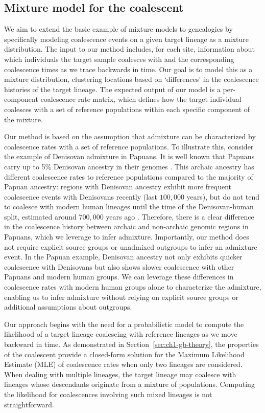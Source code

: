 \subsection{Mixture model for the coalescent}
\label{the_model}
We aim to extend the basic example of mixture models to genealogies by specifically modeling coalescence events on a given target lineage as a mixture distribution. The input to our method includes, for each site, information about which individuals the target sample coalesces with and the corresponding coalescence times as we trace backwards in time. Our goal is to model this as a mixture distribution, clustering locations based on `differences' in the coalescence histories of the target lineage. The expected output of our model is a per-component coalescence rate matrix, which defines how the target individual coalesces with a set of reference populations within each specific component of the mixture.

Our method is based on the assumption that admixture can be characterized by coalescence rates with a set of reference populations. To illustrate this, consider the example of Denisovan admixture in Papuans. It is well known that Papuans carry up to 5\% Denisovan ancestry in their genomes \cite{reich2010genetic}. This archaic ancestry has different coalescence rates to reference populations compared to the majority of Papuan ancestry: regions with Denisovan ancestry exhibit more frequent coalescence events with Denisovans recently (last $100{,}000$ years), but do not tend to coalesce with modern human lineages until the time of the Denisovan-human split, estimated around $700{,}000$ years ago \cite{reich2010genetic}. Therefore, there is a clear difference in the coalescence history between archaic and non-archaic genomic regions in Papuans, which we leverage to infer admixture. Importantly, our method does not require explicit source groups or unadmixed outgroups to infer an admixture event. In the Papuan example, Denisovan ancestry not only exhibits quicker coalescence with Denisovans but also shows slower coalescence with other Papuans and modern human groups. We can leverage these differences in coalescence rates with modern human groups alone to characterize the admixture, enabling us to infer admixture without relying on explicit source groups or additional assumptions about outgroups.

Our approach begins with the need for a probabilistic model to compute the likelihood of a target lineage coalescing with reference lineages as we move backward in time. As demonstrated in Section~\ref{sec:ch1-gb-theory}, the properties of the coalescent provide a closed-form solution for the Maximum Likelihood Estimate (MLE) of coalescence rates when only two lineages are considered. When dealing with multiple lineages, the target lineage may coalesce with lineages whose descendants originate from a mixture of populations. Computing the likelihood for coalescences involving such mixed lineages is not straightforward. 

